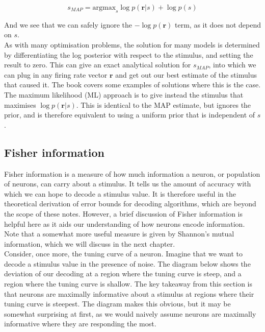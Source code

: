 \documentclass{article}
\begin{document}
\begin{equation*}
	s_{MAP} = \text{argmax}_s \log p(\bm{r}|s) + \log p(s)
\end{equation*}

And we see that we can safely ignore the $-\log p(\bm{r})$ term, as it does not depend on $s$.\\

As with many optimisation problems, the solution for many models is determined by differentiating the log posterior with respect to the stimulus, and setting the result to zero. This can give an exact analytical solution for $s_{MAP}$, into which we can plug in any firing rate vector $\bm{r}$ and get out our best estimate of the stimulus that caused it. The book covers some examples of solutions where this is the case.\\

The maximum likelihood (ML) approach is to give instead the stimulus that maximises $\log p(\bm{r}|s)$. This is identical to the MAP estimate, but ignores the prior, and is therefore equivalent to using a uniform prior that is independent of $s$.

\subsection{Fisher information}

Fisher information is a measure of how much information a neuron, or population of neurons, can carry about a stimulus. It tells us the amount of accuracy with which we can hope to decode a stimulus value. It is therefore useful in the theoretical derivation of error bounds for decoding algorithms, which are beyond the scope of these notes. However, a brief discussion of Fisher information is helpful here as it aids our understanding of how neurons encode information. Note that a somewhat more useful measure is given by Shannon's mutual information, which we will discuss in the next chapter.\\

Consider, once more, the tuning curve of a neuron. Imagine that we want to decode a stimulus value in the presence of noise. The diagram below shows the deviation of our decoding at a region where the tuning curve is steep, and a region where the tuning curve is shallow. The key takeaway from this section is that neurons are maximally informative about a stimulus at regions where their tuning curve is steepest. The diagram makes this obvious, but it may be somewhat surprising at first, as we would naively assume neurons are maximally informative where they are responding the most.
\end{document}
